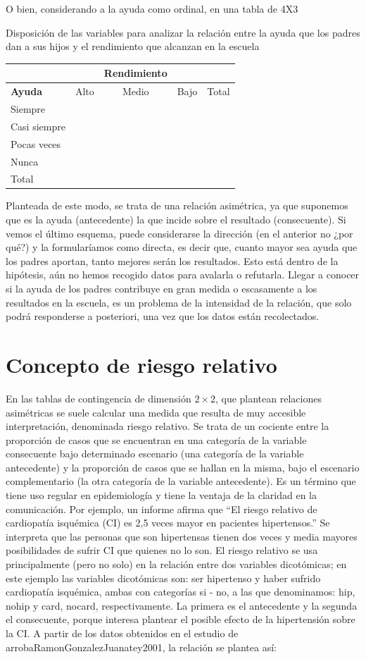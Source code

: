 \documentclass[]{book}
\begin{document}
O bien, considerando a la ayuda como ordinal, en una tabla de 4X3

Disposición de las variables para analizar la relación entre la ayuda
que los padres dan a sus hijos y el rendimiento que alcanzan en la
escuela

\begin{longtable}[]{@{}llcll@{}}
\toprule
& & Rendimiento & &\tabularnewline
\midrule
\endhead
\textbf{Ayuda} & Alto & Medio & Bajo & Total\tabularnewline
Siempre & & & &\tabularnewline
Casi siempre & & & &\tabularnewline
Pocas veces & & & &\tabularnewline
Nunca & & & &\tabularnewline
Total & & & &\tabularnewline
\bottomrule
\end{longtable}

Planteada de este modo, se trata de una relación asimétrica, ya que
suponemos que es la ayuda (antecedente) la que incide sobre el resultado
(consecuente). Si vemos el último esquema, puede considerarse la
dirección (en el anterior no ¿por qué?) y la formularíamos como directa,
es decir que, cuanto mayor sea ayuda que los padres aportan, tanto
mejores serán los resultados. Esto está dentro de la hipótesis, aún no
hemos recogido datos para avalarla o refutarla. Llegar a conocer si la
ayuda de los padres contribuye en gran medida o escasamente a los
resultados en la escuela, es un problema de la intensidad de la
relación, que solo podrá responderse a posteriori, una vez que los datos están recolectados.

\hypertarget{concepto-de-riesgo-relativo}{%
\section{Concepto de riesgo relativo}\label{concepto-de-riesgo-relativo}}

En las tablas de contingencia de dimensión \(2\times2\), que plantean relaciones
asimétricas se suele calcular una medida que resulta de muy accesible
interpretación, denominada riesgo relativo. Se trata de un cociente
entre la proporción de casos que se encuentran en una categoría de la
variable consecuente bajo determinado escenario (una categoría de la
variable antecedente) y la proporción de casos que se hallan en la
misma, bajo el escenario complementario (la otra categoría de la
variable antecedente). Es un término que tiene uso regular en
epidemiología y tiene la ventaja de la claridad en la comunicación. Por
ejemplo, un informe afirma que ``El riesgo relativo de cardiopatía
isquémica (CI) es 2,5 veces mayor en pacientes hipertensos.'' Se
interpreta que las personas que son hipertensas tienen dos veces y media
mayores posibilidades de sufrir CI que quienes no lo son. El riesgo relativo
se usa principalmente (pero no solo) en la relación entre dos variables
dicotómicas; en este ejemplo las variables dicotómicas son: ser hipertenso y haber sufrido cardiopatía isquémica, ambas con categorías si - no, a las que denominamos: hip, nohip y card, nocard, respectivamente. La primera es el antecedente y la segunda el consecuente, porque interesa plantear el posible efecto de la hipertensión sobre la CI. A partir de los datos obtenidos en el estudio de arrobaRamonGonzalezJuanatey2001, la relación se plantea así:
\end{document}
